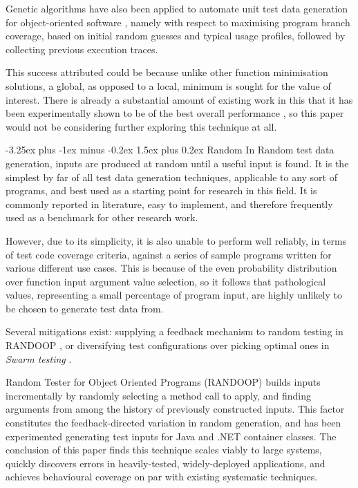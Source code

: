 \documentclass{icldt}
\makeatletter
\numberwithin{equation}{section}       %
\renewcommand{\paragraph}{\@startsection{paragraph}{4}{0ex}%
   {-3.25ex plus -1ex minus -0.2ex}%
   {1.5ex plus 0.2ex}%
   {\normalfont\normalsize\bfseries}}
\makeatother
\begin{document}
Genetic algorithms have also been applied to automate unit test data generation for object-oriented software \cite{Gupta2008} \cite{Seesing2006}, namely with respect to maximising program branch coverage, based on initial random guesses and typical usage profiles, followed by collecting previous execution traces.

This success attributed could be because unlike other function minimisation solutions, a global, as opposed to a local, minimum is sought for the value of interest. There is already a substantial amount of existing work in this that it has been experimentally shown to be of the best overall performance \cite{Han2008}, so this paper would not be considering further exploring this technique at all.

		\paragraph{Random}
In Random test data generation, inputs are produced at random until a useful input is found. It is the simplest by far of all test data generation techniques, applicable to any sort of programs, and best used as a starting point for research in this field. It is commonly reported in literature, easy to implement, and therefore frequently used as a benchmark for other research work.

However, due to its simplicity, it is also unable to perform well reliably, in terms of test code coverage criteria, against a series of sample programs written for various different use cases. This is because of the even probability distribution over function input argument value selection, so it follows that pathological values, representing a small percentage of program input, are highly unlikely to be chosen to generate test data from.

Several mitigations exist: supplying a feedback mechanism to random testing in \textsf{RANDOOP} \cite{Pacheco2007}, or diversifying test configurations over picking optimal ones in \emph{Swarm testing} \cite{AlexGroceSep2011}.

Random Tester for Object Oriented Programs (RANDOOP) builds inputs incrementally by randomly selecting a method call to apply, and finding arguments from among the history of previously constructed inputs. This factor constitutes the feedback-directed variation in random generation, and has been experimented generating test inputs for Java and .NET container classes. The conclusion of this paper finds this technique scales viably to large systems, quickly discovers errors in heavily-tested, widely-deployed applications, and achieves behavioural coverage on par with existing systematic techniques.
\end{document}
